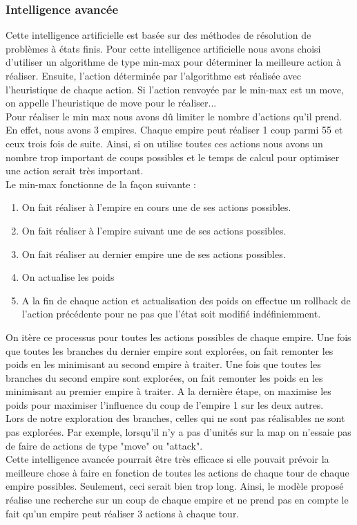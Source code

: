 \documentclass[12pt,a4paper]{article}
\begin{document}
\subsubsection{Intelligence avancée}
Cette intelligence artificielle est basée sur des méthodes de résolution de problèmes à états finis. Pour cette intelligence artificielle nous avons choisi d'utiliser un algorithme de type min-max pour déterminer la meilleure action à réaliser. Ensuite, l'action déterminée par l'algorithme est réalisée avec l'heuristique de chaque action. Si l'action renvoyée par le min-max est un move, on appelle l'heuristique de move pour le réaliser... \\
Pour réaliser le min max nous avons dû limiter le nombre d'actions qu'il prend. En effet, nous avons 3 empires. Chaque empire peut réaliser 1 coup parmi 55 et ceux trois fois de suite. Ainsi, si on utilise toutes ces actions nous avons un nombre trop important de coups possibles et le temps de calcul pour optimiser une action serait très important.\\
Le min-max fonctionne de la façon suivante : 
\begin{enumerate}
    \item On fait réaliser à l'empire en cours une de ses actions possibles. 
    \item On fait réaliser à l'empire suivant une de ses actions possibles. 
    \item On fait réaliser au dernier empire une de ses actions possibles. 
    \item On actualise les poids
    \item A la fin de chaque action et actualisation des poids on effectue un rollback de l'action précédente pour ne pas que l'état soit modifié indéfiniemment.
\end{enumerate}
On itère ce processus pour toutes les actions possibles de chaque empire. Une fois que toutes les branches du dernier empire sont explorées, on fait remonter les poids en les minimisant au second empire à traiter. Une fois que toutes les branches du second empire sont explorées, on fait remonter les poids en les minimisant au premier empire à traiter. A la dernière étape, on maximise les poids pour maximiser l'influence du coup de l'empire 1 sur les deux autres. 
\\Lors de notre exploration des branches, celles qui ne sont pas réalisables ne sont pas explorées. Par exemple, lorsqu'il n'y a pas d'unités sur la map on n'essaie pas de faire de actions de type "move" ou "attack".
\\Cette intelligence avancée pourrait être très efficace si elle pouvait prévoir la meilleure chose à faire en fonction de toutes les actions de chaque tour de chaque empire possibles. Seulement, ceci serait bien trop long. Ainsi, le modèle proposé réalise une recherche sur un coup de chaque empire et ne prend pas en compte le fait qu'un empire peut réaliser 3 actions à chaque tour. 
\end{document}
